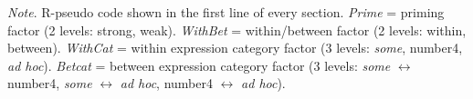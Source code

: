 \documentclass[10pt]{article}
\begin{document}
\begin{table}[h]
    \emph{Note}. R-pseudo code shown in the first line of every section.
  \emph{Prime} = priming factor (2 levels: strong, weak).
  \emph{WithBet} = within/between factor (2 levels: within, between).
  \emph{WithCat} = within expression category factor (3 levels: \emph{some}, number4, \emph{ad hoc}).
  \emph{Betcat} = between expression category factor (3 levels: \emph{some} \(\leftrightarrow\) number4, \emph{some} \(\leftrightarrow\) \emph{ad hoc}, number4 \(\leftrightarrow\) \emph{ad hoc}).
\end{table}


\vfill
\printbibliography
\end{document}
